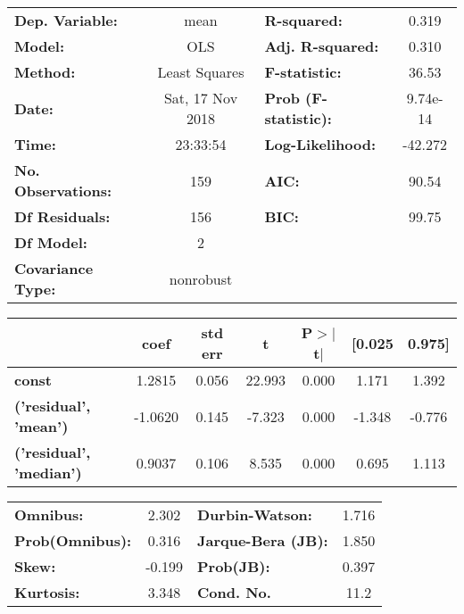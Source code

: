 \begin{center}
\begin{tabular}{lclc}
\toprule
\textbf{Dep. Variable:}    &       mean       & \textbf{  R-squared:         } &    0.319  \\
\textbf{Model:}            &       OLS        & \textbf{  Adj. R-squared:    } &    0.310  \\
\textbf{Method:}           &  Least Squares   & \textbf{  F-statistic:       } &    36.53  \\
\textbf{Date:}             & Sat, 17 Nov 2018 & \textbf{  Prob (F-statistic):} & 9.74e-14  \\
\textbf{Time:}             &     23:33:54     & \textbf{  Log-Likelihood:    } &  -42.272  \\
\textbf{No. Observations:} &         159      & \textbf{  AIC:               } &    90.54  \\
\textbf{Df Residuals:}     &         156      & \textbf{  BIC:               } &    99.75  \\
\textbf{Df Model:}         &           2      & \textbf{                     } &           \\
\textbf{Covariance Type:}  &    nonrobust     & \textbf{                     } &           \\
\bottomrule
\end{tabular}
\end{center}\begin{center}
\begin{tabular}{lcccccc}
\toprule
                                & \textbf{coef} & \textbf{std err} & \textbf{t} & \textbf{P$>$$|$t$|$} & \textbf{[0.025} & \textbf{0.975]}  \\
\midrule
\textbf{const}                  &       1.2815  &        0.056     &    22.993  &         0.000        &        1.171    &        1.392     \\
\textbf{('residual', 'mean')}   &      -1.0620  &        0.145     &    -7.323  &         0.000        &       -1.348    &       -0.776     \\
\textbf{('residual', 'median')} &       0.9037  &        0.106     &     8.535  &         0.000        &        0.695    &        1.113     \\
\bottomrule
\end{tabular}
\end{center}\begin{center}
\begin{tabular}{lclc}
\toprule
\textbf{Omnibus:}       &  2.302 & \textbf{  Durbin-Watson:     } &    1.716  \\
\textbf{Prob(Omnibus):} &  0.316 & \textbf{  Jarque-Bera (JB):  } &    1.850  \\
\textbf{Skew:}          & -0.199 & \textbf{  Prob(JB):          } &    0.397  \\
\textbf{Kurtosis:}      &  3.348 & \textbf{  Cond. No.          } &     11.2  \\
\bottomrule
\end{tabular}
\end{center}